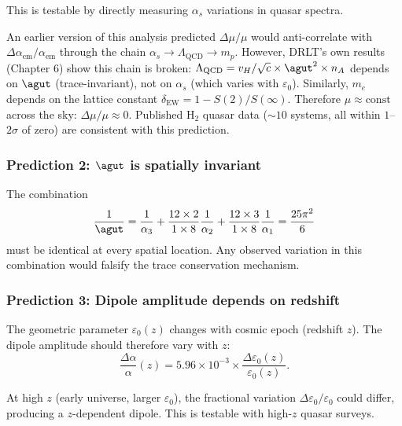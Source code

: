 This is testable by directly measuring $\alpha_s$ variations in quasar spectra.

\begin{remark}[$\mu = m_p/m_e$ is trace-protected]
An earlier version of this analysis predicted $\Delta\mu/\mu$ would anti-correlate with $\Delta\alpha_\text{em}/\alpha_\text{em}$ through the chain $\alpha_s \to \Lambda_\text{QCD} \to m_p$. However, DRLT's own results (Chapter 6) show this chain is broken: $\Lambda_\text{QCD} = v_H/\sqrt{c} \times \agut^2 \times n_A$ depends on $\agut$ (trace-invariant), not on $\alpha_s$ (which varies with $\varepsilon_0$). Similarly, $m_e$ depends on the lattice constant $\delta_\text{EW} = 1 - S(2)/S(\infty)$. Therefore $\mu \approx \text{const}$ across the sky: $\Delta\mu/\mu \approx 0$. Published H$_2$ quasar data ($\sim 10$ systems, all within $1$--$2\sigma$ of zero) are consistent with this prediction.
\end{remark}

\subsubsection{Prediction 2: $\agut$ is spatially invariant}

The combination
\begin{equation}
\frac{1}{\agut} = \frac{1}{\alpha_3} + \frac{12 \times 2}{1 \times 8}\frac{1}{\alpha_2} + \frac{12 \times 3}{1 \times 8}\frac{1}{\alpha_1} = \frac{25\pi^2}{6}
\end{equation}
must be identical at every spatial location. Any observed variation in this combination would falsify the trace conservation mechanism.

\subsubsection{Prediction 3: Dipole amplitude depends on redshift}

The geometric parameter $\varepsilon_0(z)$ changes with cosmic epoch (redshift $z$). The dipole amplitude should therefore vary with $z$:
\begin{equation}
\frac{\Delta\alpha}{\alpha}(z) = 5.96 \times 10^{-3} \times \frac{\Delta\varepsilon_0(z)}{\varepsilon_0(z)}.
\end{equation}

At high $z$ (early universe, larger $\varepsilon_0$), the fractional variation $\Delta\varepsilon_0/\varepsilon_0$ could differ, producing a $z$-dependent dipole. This is testable with high-$z$ quasar surveys.

